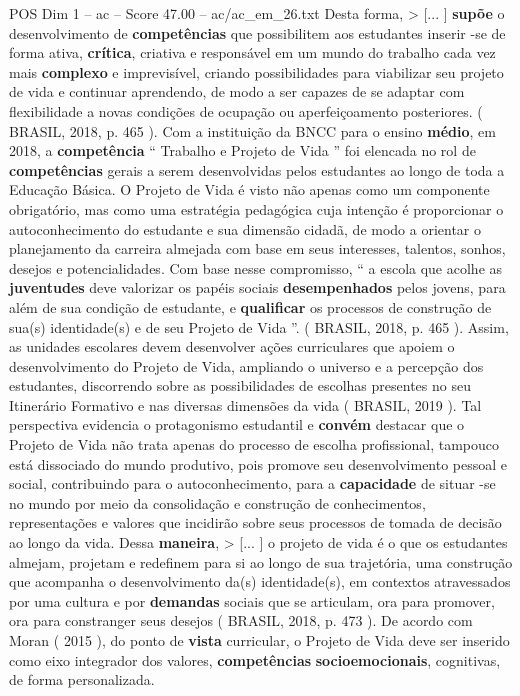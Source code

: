 \begin{textsample}{POS Dim 1 – ac – Score 47.00 – ac/ac\_em\_26.txt}
Desta forma, > [... ] \textbf{supõe} o desenvolvimento de \textbf{competências} que possibilitem aos estudantes inserir -se de forma ativa, \textbf{crítica}, criativa e responsável em um mundo do trabalho cada vez mais \textbf{complexo} e imprevisível, criando possibilidades para viabilizar seu projeto de vida e continuar aprendendo, de modo a ser capazes de se adaptar com flexibilidade a novas condições de ocupação ou aperfeiçoamento posteriores. ( BRASIL, 2018, p. 465 ).
Com a instituição da BNCC para o ensino \textbf{médio}, em 2018, a \textbf{competência} “ Trabalho e Projeto de Vida ” foi elencada no rol de \textbf{competências} gerais a serem desenvolvidas pelos estudantes ao longo de toda a Educação Básica.
O Projeto de Vida é visto não apenas como um componente obrigatório, mas como uma estratégia pedagógica cuja intenção é proporcionar o autoconhecimento do estudante e sua dimensão cidadã, de modo a orientar o planejamento da carreira almejada com base em seus interesses, talentos, sonhos, desejos e potencialidades.
Com base nesse compromisso, “ a escola que acolhe as \textbf{juventudes} deve valorizar os papéis sociais \textbf{desempenhados} pelos jovens, para além de sua condição de estudante, e \textbf{qualificar} os processos de construção de sua(s) identidade(s) e de seu Projeto de Vida ”. ( BRASIL, 2018, p. 465 ).
Assim, as unidades escolares devem desenvolver ações curriculares que apoiem o desenvolvimento do Projeto de Vida, ampliando o universo e a percepção dos estudantes, discorrendo sobre as possibilidades de escolhas presentes no seu Itinerário Formativo e nas diversas dimensões da vida ( BRASIL, 2019 ).
Tal perspectiva evidencia o protagonismo estudantil e \textbf{convém} destacar que o Projeto de Vida não trata apenas do processo de escolha profissional, tampouco está dissociado do mundo produtivo, pois promove seu desenvolvimento pessoal e social, contribuindo para o autoconhecimento, para a \textbf{capacidade} de situar -se no mundo por meio da consolidação e construção de conhecimentos, representações e valores que incidirão sobre seus processos de tomada de decisão ao longo da vida.
Dessa \textbf{maneira}, > [... ] o projeto de vida é o que os estudantes almejam, projetam e redefinem para si ao longo de sua trajetória, uma construção que acompanha o desenvolvimento da(s) identidade(s), em contextos atravessados por uma cultura e por \textbf{demandas} sociais que se articulam, ora para promover, ora para constranger seus desejos ( BRASIL, 2018, p. 473 ).
De acordo com Moran ( 2015 ), do ponto de \textbf{vista} curricular, o Projeto de Vida deve ser inserido como eixo integrador dos valores, \textbf{competências} \textbf{socioemocionais}, cognitivas, de forma personalizada.

\end{textsample}
